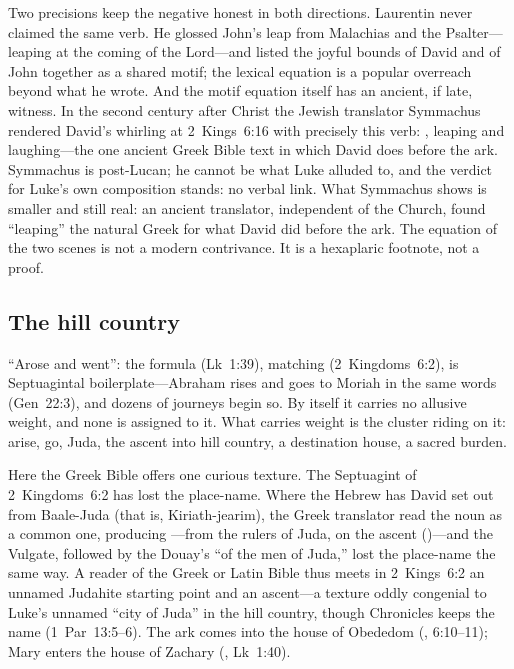 Two precisions keep the negative honest in both directions. Laurentin
never claimed the same verb. He glossed John's leap from Malachias and
the Psalter---leaping at the coming of the Lord---and listed the joyful
bounds of David and of John together as a shared motif; the lexical
equation is a popular overreach beyond what he wrote. And the motif
equation itself has an ancient, if late, witness. In the second century after Christ the
Jewish translator Symmachus rendered David's whirling at 2~Kings~6:16 with
precisely this verb: , leaping and
laughing---the one ancient Greek Bible text in which David does
 before the ark. Symmachus is post-Lucan; he cannot be what Luke
alluded to, and the verdict for Luke's own composition stands: no verbal
link. What Symmachus shows is smaller and still real: an ancient
translator, independent of the Church, found ``leaping'' the natural
Greek for what David did before the ark. The equation of the two
scenes is not a modern contrivance. It is a hexaplaric footnote, not a
proof.

\subsection{The hill country}

``Arose and went'': the formula  (Lk~1:39),
matching  (2~Kingdoms~6:2), is
Septuagintal boilerplate---Abraham rises and goes to Moriah in the same
words (Gen~22:3), and dozens of journeys begin so. By itself it carries no
allusive weight, and none is assigned to it. What carries weight is the
cluster riding on it: arise, go, Juda, the ascent into hill country, a
destination house, a sacred burden.

Here the Greek Bible offers one curious texture. The Septuagint of
2~Kingdoms~6:2 has lost the place-name. Where the Hebrew has David set
out from Baale-Juda (that is, Kiriath-jearim), the Greek translator read
the noun as a common one,
producing ---from the rulers of Juda, on the
ascent ()---and the Vulgate, followed by the Douay's
``of the men of Juda,'' lost the place-name the same way. A reader of the
Greek or Latin Bible thus meets in 2~Kings~6:2 an unnamed Judahite starting
point and an ascent---a texture oddly congenial to Luke's unnamed ``city
of Juda'' in the hill country, though Chronicles keeps the name
(1~Par~13:5--6). The ark comes into the house of Obededom
(, 6:10--11); Mary enters the house of
Zachary (, Lk~1:40).

